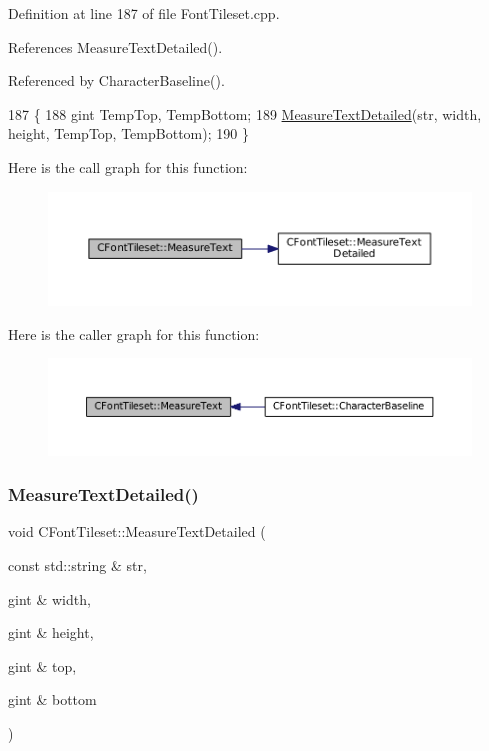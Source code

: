 Definition at line 187 of file Font\+Tileset.\+cpp.



References Measure\+Text\+Detailed().



Referenced by Character\+Baseline().


\begin{DoxyCode}
187                                                                              \{
188     gint TempTop, TempBottom;
189     \hyperlink{classCFontTileset_a7afa08157a6bea6c0fbd06299685b8b3}{MeasureTextDetailed}(str, width, height, TempTop, TempBottom);
190 \}
\end{DoxyCode}
Here is the call graph for this function\+:\nopagebreak
\begin{figure}[H]
\begin{center}
\leavevmode
\includegraphics[width=350pt]{classCFontTileset_ad6902d89c94a309fb487d4dbdec97a15_cgraph}
\end{center}
\end{figure}
Here is the caller graph for this function\+:\nopagebreak
\begin{figure}[H]
\begin{center}
\leavevmode
\includegraphics[width=350pt]{classCFontTileset_ad6902d89c94a309fb487d4dbdec97a15_icgraph}
\end{center}
\end{figure}
\hypertarget{classCFontTileset_a7afa08157a6bea6c0fbd06299685b8b3}{}\label{classCFontTileset_a7afa08157a6bea6c0fbd06299685b8b3} 
\subsubsection{\texorpdfstring{Measure\+Text\+Detailed()}{MeasureTextDetailed()}}
{\footnotesize\ttfamily void C\+Font\+Tileset\+::\+Measure\+Text\+Detailed (\begin{DoxyParamCaption}\item[{const std\+::string \&}]{str,  }\item[{gint \&}]{width,  }\item[{gint \&}]{height,  }\item[{gint \&}]{top,  }\item[{gint \&}]{bottom }\end{DoxyParamCaption})}



